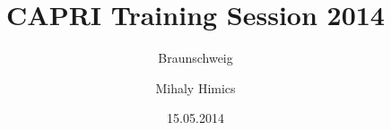 \documentclass[t]{beamer}
\title[TS Braunschweig 2014]{CAPRI Training Session 2014}
\subtitle{Braunschweig}
\author{Mihaly Himics}
\institute{
	\texttt{[image: figure/eurocare\_logo.png]}%
}
\date{15.05.2014}
\begin{document}
\begin{frame}
\titlepage
\end{frame}



\end{document}
